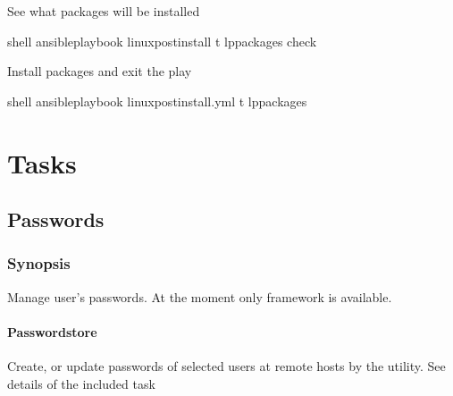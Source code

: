 \documentclass[letterpaper,10pt,english]{sphinxmanual}
\begin{document}
See what packages will be installed

%
\begin{sphinxVerbatim}[commandchars=\\\{\}]
 shell\PYGZgt{} ansible\PYGZhy{}playbook linux\PYGZus{}postinstall \PYGZhy{}t lp\PYGZus{}packages \PYGZhy{}\PYGZhy{}check
\end{sphinxVerbatim}
\sphinxresetverbatimhllines

Install packages and exit the play

%
\begin{sphinxVerbatim}[commandchars=\\\{\}]
 shell\PYGZgt{} ansible\PYGZhy{}playbook linux\PYGZus{}postinstall.yml \PYGZhy{}t lp\PYGZus{}packages
\end{sphinxVerbatim}
\sphinxresetverbatimhllines


\section{Tasks}
\label{\detokenize{guide:tasks}}\label{\detokenize{guide:ug-tasks}}

\subsection{Passwords}
\label{\detokenize{guide:passwords}}\label{\detokenize{guide:ug-task-passwords}}

\subsubsection{Synopsis}
\label{\detokenize{guide:synopsis}}
Manage user’s passwords. At the moment only  framework is available.

\ignorespaces 

\paragraph{Passwordstore}
\label{\detokenize{task-passwords-passwordstore:passwordstore}}\label{\detokenize{task-passwords-passwordstore:index-0}}\label{\detokenize{task-passwords-passwordstore::doc}}
Create, or update passwords of selected users at remote hosts by the
  utility. See details of the included task 
\end{document}
